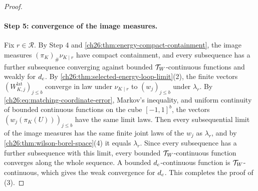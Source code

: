 \begin{proof}
\paragraph{Step 5: convergence of the image measures.}
Fix $r\in\mathcal R$. By Step 4 and \cref{ch26:thm:energy-compact-containment}, the image measures $(\pi_K)_\#\nu_{K\mid r}$ have compact containment, and every subsequence has a further subsequence converging against bounded $\mathcal T_W$-continuous functions and weakly for $d_c$. By \cref{ch26:thm:selected-energy-loop-limit}(2), the finite vectors $(W^{\mathrm{lat}}_{K,j})_{j\le b}$ converge in law under $\nu_{K\mid r}$ to $(w_j)_{j\le b}$ under $\lambda_r$. By \eqref{ch26:eq:matching-coordinate-error}, Markov's inequality, and uniform continuity of bounded continuous functions on the cube $[-1,1]^b$, the vectors $(w_j(\pi_K(U)))_{j\le b}$ have the same limit laws. Then every subsequential limit of the image measures has the same finite joint laws of the $w_j$ as $\lambda_r$, and by \cref{ch26:thm:wilson-borel-space}(4) it equals $\lambda_r$. Since every subsequence has a further subsequence with this limit, every bounded $\mathcal T_W$-continuous function converges along the whole sequence. A bounded $d_c$-continuous function is $\mathcal T_W$-continuous, which gives the weak convergence for $d_c$. This completes the proof of (3).


\end{proof}
